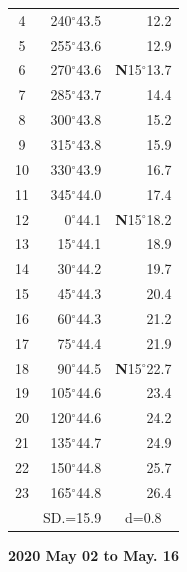 \documentclass[10pt, a4paper]{report}
\begin{document}
\begin{scriptsize}
\begin{tabular*}{0.2\textwidth}[t]{@{\extracolsep{\fill}}|c|rr|}
4 & 240$^\circ$43.5 & 12.2\\
5 & 255$^\circ$43.6 & 12.9\\[2Pt]
6 & 270$^\circ$43.6 & \textbf{N}15$^\circ$13.7\\
7 & 285$^\circ$43.7 & 14.4\\
8 & 300$^\circ$43.8 & 15.2\\
9 & 315$^\circ$43.8 & \raisebox{0.24ex}{\boldmath$\cdot$~\boldmath$\cdot$~~}15.9\\
10 & 330$^\circ$43.9 & 16.7\\
11 & 345$^\circ$44.0 & 17.4\\[2Pt]
12 & 0$^\circ$44.1 & \textbf{N}15$^\circ$18.2\\
13 & 15$^\circ$44.1 & 18.9\\
14 & 30$^\circ$44.2 & 19.7\\
15 & 45$^\circ$44.3 & \raisebox{0.24ex}{\boldmath$\cdot$~\boldmath$\cdot$~~}20.4\\
16 & 60$^\circ$44.3 & 21.2\\
17 & 75$^\circ$44.4 & 21.9\\[2Pt]
18 & 90$^\circ$44.5 & \textbf{N}15$^\circ$22.7\\
19 & 105$^\circ$44.6 & 23.4\\
20 & 120$^\circ$44.6 & 24.2\\
21 & 135$^\circ$44.7 & \raisebox{0.24ex}{\boldmath$\cdot$~\boldmath$\cdot$~~}24.9\\
22 & 150$^\circ$44.8 & 25.7\\
23 & 165$^\circ$44.8 & 26.4\\
\hline
\rule{0pt}{2.4ex} & \multicolumn{1}{c}{SD.=15.9} & \multicolumn{1}{c|}{d=0.8}\\
\hline
\end{tabular*}

\end{scriptsize}
\newpage
\sffamily
\noindent
\begin{flushright}
\textbf{2020 May 02 to May. 16}\par
\end{flushright}
\end{document}
